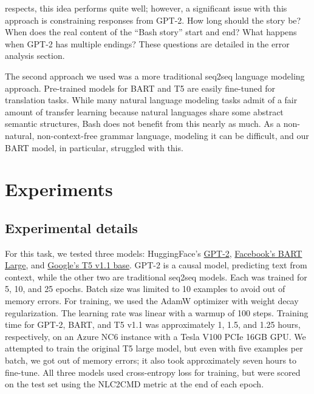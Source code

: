 \documentclass{article}
\begin{document}
respects, this idea performs quite well; however, a significant issue with this
approach is constraining responses from GPT-2. How long should the story be?
When does the real content of the ``Bash story'' start and end? What happens
when GPT-2 has multiple endings? These questions are detailed in the error
analysis section.
\par
The second approach we used was a more traditional seq2seq language modeling
approach. Pre-trained models for BART and T5 are easily fine-tuned for
translation tasks. While many natural language modeling tasks admit of a fair
amount of transfer learning because natural languages share some abstract
semantic structures, Bash does not benefit from this nearly as much. As a
non-natural, non-context-free grammar language, modeling it can be difficult,
and our BART model, in particular, struggled with this.

\section{Experiments}


\subsection{Experimental details}
For this task, we tested three models: HuggingFace's
\href{https://huggingface.co/GPT-2}{GPT-2}\cite{GPT-2},
\href{https://huggingface.co/facebook/bart-large}{Facebook's BART
	Large}\cite{bart}, and \href{https://huggingface.co/google/t5-v1_1-base}{Google's T5 v1.1
  base}. GPT-2 is a causal model, predicting text from context, while the other
  two are traditional seq2seq models. Each was trained for 5, 10, and 25
  epochs. Batch size was limited to 10 examples to avoid out of memory errors.
  For training, we used the AdamW optimizer with weight decay regularization.
  The learning rate was linear with a warmup of 100 steps. Training time for
  GPT-2, BART, and T5 v1.1 was approximately 1, 1.5, and 1.25 hours,
  respectively, on an Azure NC6 instance with a Tesla V100 PCIe 16GB GPU. We
  attempted to train the original T5 large model, but even with five examples per
  batch, we got out of memory errors; it also took approximately seven hours to
  fine-tune. All three models used cross-entropy loss for training, but were scored
  on the test set using the NLC2CMD metric at the end of each epoch.
\end{document}
